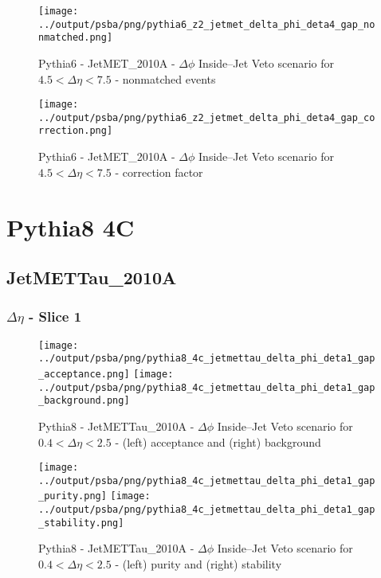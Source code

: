 \documentclass[11pt]{book}
\begin{document}
\begin{figure}[ht]
\centering
\texttt{[image: ../output/psba/png/pythia6\_z2\_jetmet\_delta\_phi\_deta4\_gap\_nonmatched.png]}
\caption{Pythia6 - JetMET\_2010A - $\Delta\phi$ Inside--Jet Veto scenario for $4.5 < \Delta\eta < 7.5$ - nonmatched events}
\label{fig:p6_jetmet_delta_phi_deta4_gap_nonmatched}
\end{figure}

\begin{figure}[ht]
\centering
\texttt{[image: ../output/psba/png/pythia6\_z2\_jetmet\_delta\_phi\_deta4\_gap\_correction.png]}
\caption{Pythia6 - JetMET\_2010A - $\Delta\phi$ Inside--Jet Veto scenario for $4.5 < \Delta\eta < 7.5$ - correction factor}
\label{fig:p6_jetmet_delta_phi_deta4_gap_correction}
\end{figure}

\clearpage
\section{Pythia8 4C}
\subsection{JetMETTau\_2010A}
\subsubsection{$\Delta\eta$ - Slice 1}

\begin{figure}[ht]
\centering
\texttt{[image: ../output/psba/png/pythia8\_4c\_jetmettau\_delta\_phi\_deta1\_gap\_acceptance.png]}
\texttt{[image: ../output/psba/png/pythia8\_4c\_jetmettau\_delta\_phi\_deta1\_gap\_background.png]}
\caption{Pythia8 - JetMETTau\_2010A - $\Delta\phi$ Inside--Jet Veto scenario for $0.4 < \Delta\eta < 2.5$ - (left) acceptance and (right) background}
\label{fig:p8_jetmettau_delta_phi_deta1_gap_ab}
\end{figure}

\begin{figure}[ht]
\centering
\texttt{[image: ../output/psba/png/pythia8\_4c\_jetmettau\_delta\_phi\_deta1\_gap\_purity.png]}
\texttt{[image: ../output/psba/png/pythia8\_4c\_jetmettau\_delta\_phi\_deta1\_gap\_stability.png]}
\caption{Pythia8 - JetMETTau\_2010A - $\Delta\phi$ Inside--Jet Veto scenario for $0.4 < \Delta\eta < 2.5$ - (left) purity and (right) stability}
\label{fig:p8_jetmettau_delta_phi_deta1_gap_ps}
\end{figure}
\end{document}
